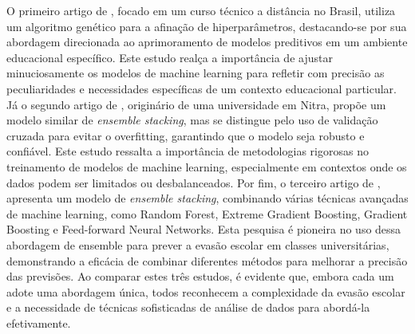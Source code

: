 \begin{table}[ht!]
\centering
\caption{Comparação entre os estudos de evasão escolar}
\label{tab:comparacao_estudos}
\end{table}

O primeiro artigo de , focado em um curso técnico a distância no Brasil, utiliza um algoritmo genético para a afinação de hiperparâmetros, destacando-se por sua abordagem direcionada ao aprimoramento de modelos preditivos em um ambiente educacional específico. Este estudo realça a importância de ajustar minuciosamente os modelos de machine learning para refletir com precisão as peculiaridades e necessidades específicas de um contexto educacional particular. Já o segundo artigo de , originário de uma universidade em Nitra, propõe um modelo similar de \textit{ensemble stacking}, mas se distingue pelo uso de validação cruzada para evitar o overfitting, garantindo que o modelo seja robusto e confiável. Este estudo ressalta a importância de metodologias rigorosas no treinamento de modelos de machine learning, especialmente em contextos onde os dados podem ser limitados ou desbalanceados. Por fim, o terceiro artigo de , apresenta um modelo de \textit{ensemble stacking}, combinando várias técnicas avançadas de machine learning, como Random Forest, Extreme Gradient Boosting, Gradient Boosting e Feed-forward Neural Networks. Esta pesquisa é pioneira no uso dessa abordagem de ensemble para prever a evasão escolar em classes universitárias, demonstrando a eficácia de combinar diferentes métodos para melhorar a precisão das previsões. Ao comparar estes três estudos, é evidente que, embora cada um adote uma abordagem única, todos reconhecem a complexidade da evasão escolar e a necessidade de técnicas sofisticadas de análise de dados para abordá-la efetivamente.

